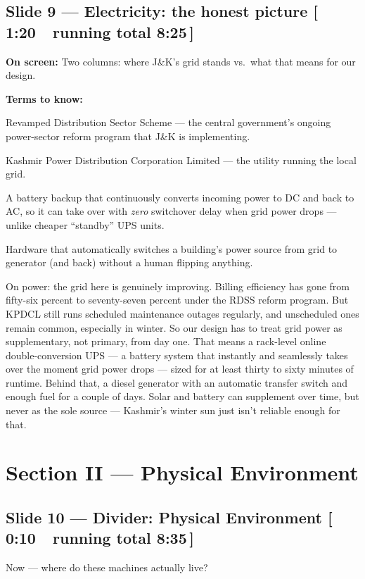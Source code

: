 \documentclass[11pt]{article}
\newcommand{\onscreen}[1]{\noindent\textbf{\color{sovGrey}On screen:} #1\par\vspace{4pt}}
\newcommand{\timing}[2]{\hfill{\normalsize\color{sovGrey}[\,#1\ \textbar\ running total #2\,]}}
\newenvironment{terms}
  {\noindent\textbf{\color{sovGrey}Terms to know:}
   \begin{description}[leftmargin=0pt,style=sameline,labelindent=0pt,itemsep=2pt,topsep=2pt,font=\normalfont\bfseries\color{sovDark}]}
  {\end{description}\vspace{2pt}}
\begin{document}
\subsection*{Slide 9 --- Electricity: the honest picture \timing{1:20}{8:25}}
\onscreen{Two columns: where J\&K's grid stands vs.\ what that means for our design.}
\begin{terms}
  \item[RDSS] Revamped Distribution Sector Scheme --- the central government's ongoing
    power-sector reform program that J\&K is implementing.
  \item[KPDCL] Kashmir Power Distribution Corporation Limited --- the utility running
    the local grid.
  \item[Online double-conversion UPS] A battery backup that continuously converts
    incoming power to DC and back to AC, so it can take over with \emph{zero}
    switchover delay when grid power drops --- unlike cheaper ``standby'' UPS units.
  \item[Auto-transfer switch] Hardware that automatically switches a building's power
    source from grid to generator (and back) without a human flipping anything.
\end{terms}
\begin{sayit}
On power: the grid here is genuinely improving. Billing efficiency has gone from
fifty-six percent to seventy-seven percent under the RDSS reform program. But KPDCL
still runs scheduled maintenance outages regularly, and unscheduled ones remain common,
especially in winter. So our design has to treat grid power as supplementary, not
primary, from day one. That means a rack-level online double-conversion UPS --- a
battery system that instantly and seamlessly takes over the moment grid power drops ---
sized for at least thirty to sixty minutes of runtime. Behind that, a diesel generator
with an automatic transfer switch and enough fuel for a couple of days. Solar and
battery can supplement over time, but never as the sole source --- Kashmir's winter sun
just isn't reliable enough for that.
\end{sayit}

\section{Section II --- Physical Environment}

\subsection*{Slide 10 --- Divider: Physical Environment \timing{0:10}{8:35}}
\begin{sayit}
Now --- where do these machines actually live?
\end{sayit}
\end{document}
